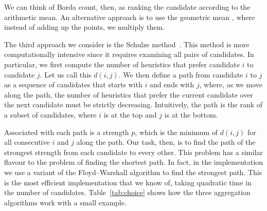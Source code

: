\documentclass[fleqn,10pt,lineno]{wlpeerj} %
\begin{document}
We can think of Borda count, then, as ranking the candidate according to the
arithmetic mean. An alternative approach is to use the geometric mean
\citep{bedo14}, where instead of adding up the points, we multiply them.

The third approach we consider is the Schulze method~\citep{schulze11}. This
method is more computationally intensive since it requires examining all pairs
of candidates. In particular, we first compute the number of heuristics that
prefer candidate $i$ to candidate $j$. Let us call this $d(i, j)$. We then
define a path from candidate $i$ to $j$ as a sequence of candidates that starts
with $i$ and ends with $j$, where, as we move along the path, the number of
heuristics that prefer the current candidate over the next candidate must be
strictly decreasing. Intuitively, the path is the rank of a subset of
candidates, where $i$ is at the top and $j$ is at the bottom.

Associated with each path is a strength $p$, which is the minimum of $d(i, j)$
for all consecutive $i$ and $j$ along the path. Our task, then, is to find the
path of the strongest strength from each candidate to every other. This problem
has a similar flavour to the problem of finding the shortest path. In fact, in
the implementation we use a variant of the Floyd–Warshall algorithm to find the
strongest path. This is the most efficient implementation that we know of,
taking quadratic time in the number of candidates. Table~\ref{tab:choice} shows
how the three aggregation algorithms work with a small example.
\end{document}
